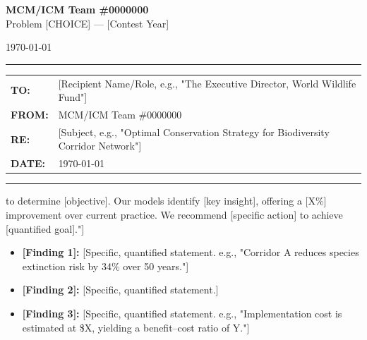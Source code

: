 \documentclass[11pt, a4paper]{article}
\begin{document}

\noindent
\begin{minipage}[t]{0.65\textwidth}
    {\large\bfseries\color{accentblue} MCM/ICM Team \#0000000}\\[2pt]
    {\small Problem [CHOICE] — [Contest Year]}
\end{minipage}%
\begin{minipage}[t]{0.35\textwidth}
    \raggedleft
    {\small\color{gray} \today}
\end{minipage}

\vspace{4pt}
\noindent\rule{\linewidth}{1.5pt}
\vspace{2pt}

\noindent
\begin{tabular}{@{}ll}
\textbf{TO:}   & [Recipient Name/Role, e.g., "The Executive Director, World Wildlife Fund"] \\[2pt]
\textbf{FROM:} & MCM/ICM Team \#0000000 \\[2pt]
\textbf{RE:}   & [Subject, e.g., "Optimal Conservation Strategy for Biodiversity Corridor Network"] \\[2pt]
\textbf{DATE:} & \today \\
\end{tabular}

\noindent\rule{\linewidth}{0.4pt}
\vspace{4pt}


\noindent
[2–3 sentences in plain language. No equations, no jargon.
State what was analyzed, what was found, and what is recommended.
Example: "We analyzed X years of [data] to determine [objective].
Our models identify [key insight], offering a [X\%] improvement over current practice.
We recommend [specific action] to achieve [quantified goal]."]

\vspace{6pt}


\begin{itemize}[nosep, leftmargin=1.2em, label={\color{accentblue}$\bullet$}]
    \item \textbf{[Finding 1]:} [Specific, quantified statement.
          e.g., "Corridor A reduces species extinction risk by 34\% over 50 years."]
    \item \textbf{[Finding 2]:} [Specific, quantified statement.]
    \item \textbf{[Finding 3]:} [Specific, quantified statement.
          e.g., "Implementation cost is estimated at \$X, yielding a benefit–cost ratio of Y."]
\end{itemize}
\end{document}
